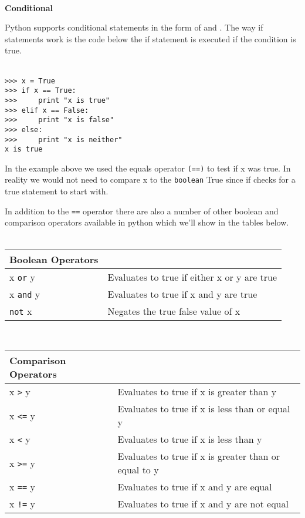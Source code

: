 \documentclass[letterpaper,11pt]{article}
\begin{document}
\\
\textbf{Conditional}
\par{Python supports conditional statements in the form of 
and . The way if statements work is the code below the if statement
is executed if the condition is true.} \\ \\
\begin{minipage}{.5\textwidth}
    \begin{tcolorbox}
        \begin{footnotesize}
            \begin{verbatim}
>>> x = True
>>> if x == True:
>>>     print "x is true"
>>> elif x == False:
>>>     print "x is false"
>>> else:
>>>     print "x is neither"
x is true
            \end{verbatim}
        \end{footnotesize}
    \end{tcolorbox}
\end{minipage}
\par{In the example above we used the equals operator \texttt{(==)} to test if x
was true. In reality we would not need to compare x to the \texttt{boolean} True
since if checks for a true statement to start with.}
\par{In addition to the \texttt{==} operator there are also a number of other
boolean and comparison operators available in python which we'll show in the
tables below.}
\\ \\
\begin{tabular}[t]{l l}
    \textbf{Boolean Operators}  \\
    \hline
    x \texttt{or} y  & Evaluates to true if either x or y are true \\
    x \texttt{and} y & Evaluates to true if x and y are true       \\
    \texttt{not} x   & Negates the true false value of x           \\
\end{tabular}
\\
\begin{tabular}[t]{l l}
    \textbf{Comparison Operators}  \\
    \hline
    x \texttt{>}  y & Evaluates to true if x is greater than y             \\
    x \texttt{<=} y & Evaluates to true if x is less than or equal y       \\
    x \texttt{<}  y & Evaluates to true if x is less than y                \\
    x \texttt{>=} y & Evaluates to true if x is greater than or equal to y \\
    x \texttt{==} y & Evaluates to true if x and y are equal               \\
    x \texttt{!=} y & Evaluates to true if x and y are not equal           \\
\end{tabular}
\end{document}
